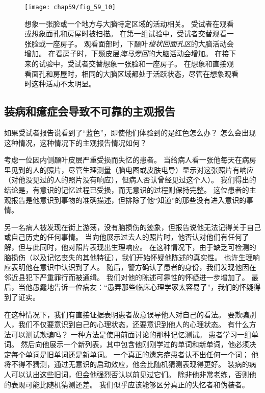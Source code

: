\begin{figure}[htbp]
	\centering
	\texttt{[image: chap59/fig\_59\_10]}
	\caption{想象一张脸或一个地方与大脑特定区域的活动相关。
		受试者在观看或想象面孔和房屋时被扫描。
		在第一组试验中，受试者交替观看一张脸或一座房子。
		观看面部时，下颞叶\textit{梭状回面孔区}的大脑活动会增加。
		在看房子时，下颞皮层\textit{海马旁回}的大脑活动会增加。
		在接下来的试验中，受试者交替想象一张脸和一座房子。
		在想象和直接观看面孔和房屋时，相同的大脑区域都处于活跃状态，尽管在想象观看时这种活动不太明显\cite{o2000mental}。}
	\label{fig:59_10}
\end{figure}



\subsection{装病和癔症会导致不可靠的主观报告}

如果受试者报告说看到了“蓝色”，即使他们体验到的是红色怎么办？
怎么会出现这种情况，这种情况下的主观报告情况如何？


考虑一位因内侧颞叶皮层严重受损而失忆的患者。
当给病人看一张他每天在病房里见到的人的照片，尽管生理测量（脑电图或皮肤电导）显示对这张照片有响应（对他没见过的人的照片没有响应），但病人否认曾经见过这个人）。
我们得出的结论是，有意识的记忆过程已受损，而无意识的过程则保持完整。
这位患者的主观报告是他意识到事物的准确描述，但排除了他“知道”的那些没有进入意识的事情。


另一名病人被发现在街上游荡，没有脑损伤的迹象，但报告说他无法记得关于自己或自己历史的任何事情。
当向他展示过去人的照片时，他否认对他们有任何了解，但与此同时，他对照片表现出生理响应。
在这种情况下，由于缺乏可检测的脑损伤（以及记忆丧失的其他特征），我们开始怀疑他陈述的真实性。
也许生理响应表明他在意识中认识到了人。
随后，警方确认了患者的身份，我们发现他因在邻近县犯下严重罪行而被通缉。
我们对他的陈述可靠性的怀疑进一步增加了。
最后，当他愚蠢地告诉一位病友：“愚弄那些临床心理学家太容易了”，我们的怀疑得到了证实。


在这种情况下，我们有直接证据表明患者故意误导他人对自己的看法。
要欺骗别人，我们不仅要意识到自己的心理状态，还要意识到他人的心理状态。
有什么方法可以测试欺骗吗？
一种方法是使用前面讨论的那种记忆测试。
患者学习一组单词。
然后向他展示一个新列表，其中包含他刚刚学过的单词和新单词，他必须决定每个单词是旧单词还是新单词。
一个真正的遗忘症患者认不出任何一个词；
他将不得不猜测，通过无意识的启动效应，他会比随机猜测表现得更好。
装病的病人可以认出这些旧词，但会他强烈否认以前见过它们。
除非他非常老练，否则他的表现可能比随机猜测还差。
我们似乎应该能够区分真正的失忆者和伪装者。


